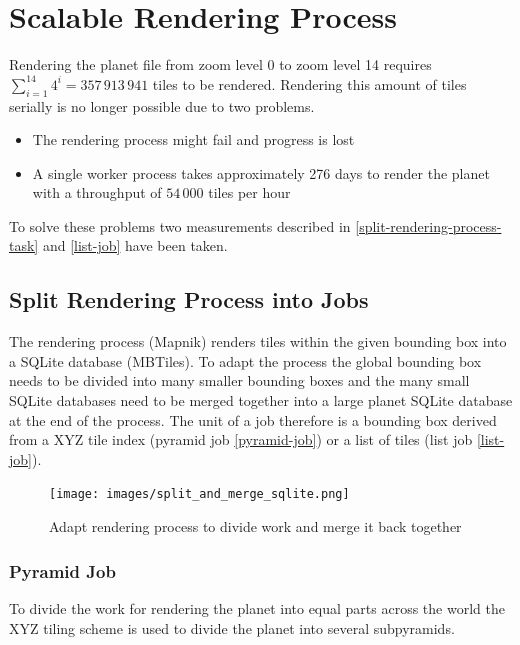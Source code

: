 \chapter{Scalable Rendering Process}

Rendering the planet file from zoom level 0 to zoom level 14 requires $\sum_{i=1}^{14} 4^i = 357\,913\,941$ tiles to be rendered. 
Rendering this amount of tiles serially is no longer possible due to two problems.

\begin{itemize}
    \item The rendering process might fail and progress is lost
    \item A single worker process takes approximately 276 days to render the planet with a throughput of $54\,000$ tiles per hour
\end{itemize}

To solve these problems two measurements described in \autoref{split-rendering-process-task} and \autoref{list-job} have been taken.

\section{Split Rendering Process into Jobs}\label{split-rendering-process-task}

The rendering process (Mapnik)
renders tiles within the given bounding box into a SQLite database (MBTiles). To adapt the process the global bounding box needs to be divided into many smaller bounding boxes and the many small SQLite databases need to be merged together into a large planet SQLite database at the end of the process.
The unit of a job therefore is a bounding box derived from a XYZ tile index (pyramid job \autoref{pyramid-job}) or a list of tiles (list job \autoref{list-job}).

\begin{figure}[H]
  \centering
  \texttt{[image: images/split\_and\_merge\_sqlite.png]}
  \caption{Adapt rendering process to divide work and merge it back together}
\end{figure}

\subsection{Pyramid Job}\label{pyramid-job}

To divide the work for rendering the planet into equal parts across the world the XYZ tiling scheme is used to divide the planet into several subpyramids.

